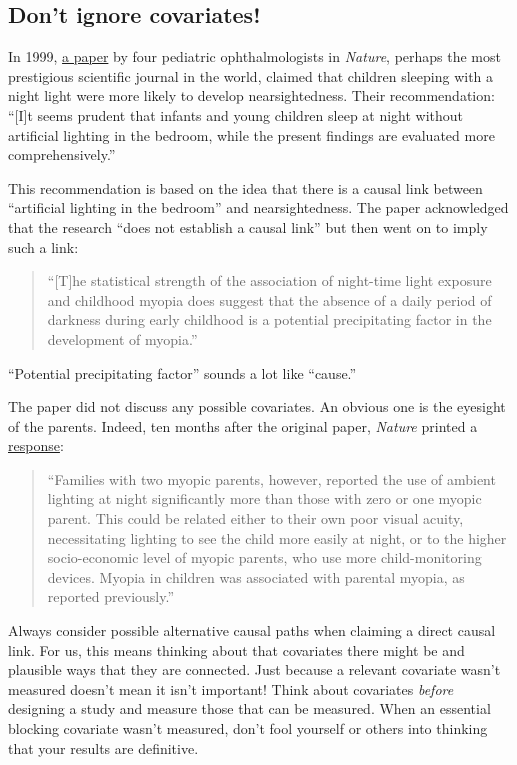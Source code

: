 \documentclass[
  letterpaper,
  DIV=11,
  numbers=noendperiod,
  oneside]{scrartcl}
\begin{document}
\subsection{Don't ignore covariates!}\label{sec-myopia-covariates}

In 1999, \href{www/myopia-20094.pdf}{a paper} by four pediatric
ophthalmologists in \emph{Nature}, perhaps the most prestigious
scientific journal in the world, claimed that children sleeping with a
night light were more likely to develop nearsightedness. Their
recommendation: ``{[}I{]}t seems prudent that infants and young children
sleep at night without artificial lighting in the bedroom, while the
present findings are evaluated more comprehensively.''

This recommendation is based on the idea that there is a causal link
between ``artificial lighting in the bedroom'' and nearsightedness. The
paper acknowledged that the research ``does not establish a causal
link'' but then went on to imply such a link:

\begin{quote}
``{[}T{]}he statistical strength of the association of night-time light
exposure and childhood myopia does suggest that the absence of a daily
period of darkness during early childhood is a potential precipitating
factor in the development of myopia.''
\end{quote}

``Potential precipitating factor'' sounds a lot like ``cause.''

The paper did not discuss any possible covariates. An obvious one is the
eyesight of the parents. Indeed, ten months after the original paper,
\emph{Nature} printed a
\href{www/myopia-response-35004665.pdf}{response}:

\begin{quote}
``Families with two myopic parents, however, reported the use of ambient
lighting at night significantly more than those with zero or one myopic
parent. This could be related either to their own poor visual acuity,
necessitating lighting to see the child more easily at night, or to the
higher socio-economic level of myopic parents, who use more
child-monitoring devices. Myopia in children was associated with
parental myopia, as reported previously.''
\end{quote}

Always consider possible alternative causal paths when claiming a direct
causal link. For us, this means thinking about that covariates there
might be and plausible ways that they are connected. Just because a
relevant covariate wasn't measured doesn't mean it isn't important!
Think about covariates \emph{before} designing a study and measure those
that can be measured. When an essential blocking covariate wasn't
measured, don't fool yourself or others into thinking that your results
are definitive.
\end{document}
